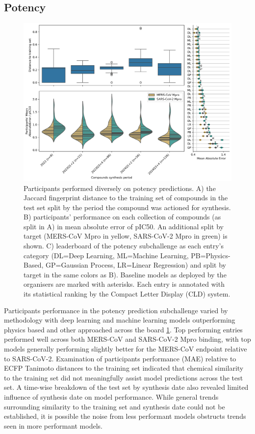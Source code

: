 \documentclass[journal=jcim,manuscript=article]{achemso}
\begin{document}
\subsection{Potency}


\begin{figure}
    \includegraphics[scale=0.6]{04_figs_leaderboards/potency_leaderboards_and_progressions.png}
  \caption{Participants performed diversely on potency predictions. A) the Jaccard fingerprint distance to the training set of compounds in the test set split by the period the compound was actioned for synthesis. B) participants' performance on each collection of compounds (as split in A) in mean absolute error of pIC50. An additional split by target (MERS-CoV Mpro in yellow, SARS-CoV-2 Mpro in green) is shown. C) leaderboard of the potency subchallenge as each entry's category (DL=Deep Learning, ML=Machine Learning, PB=Physics-Based, GP=Gaussian Process, LR=Linear Regression) and split by target in the same colors as B). Baseline models as deployed by the organisers are marked with asterisks. Each entry is annotated with its statistical ranking by the Compact Letter Display (CLD) system.}
  \label{fgr:potency_leaderboards}
\end{figure}

Participants performance in the potency prediction subchallenge varied by methodology with deep learning and machine learning models outperforming physics based and other approached across the board \ref{fgr:potency_leaderboards}. Top performing entries performed well across both MERS-CoV and SARS-CoV-2 Mpro binding, with top models generally performing slightly better for the MERS-CoV endpoint relative to SARS-CoV-2. Examination of participants performance (MAE) relative to ECFP Tanimoto distances to the training set indicated that chemical similarity to the training set did not meaningfully assist model predictions across the test set. A time-wise breakdown of the test set by synthesis date also revealed limited influence of synthesis date on model performance. While general trends surrounding similarity to the training set and synthesis date could not be established, it is possible the noise from less performant models obstructs trends seen in more performant models.
\end{document}
